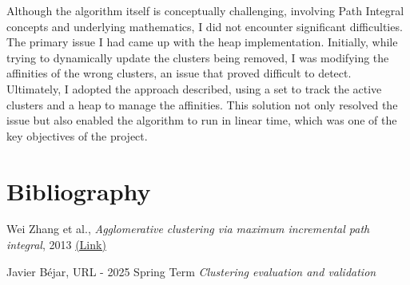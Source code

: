 \documentclass[
	10pt,
	parskip=half-,	
	paper=a4,
	english
	]{scrartcl}
\begin{document}
Although the algorithm itself is conceptually challenging, involving Path Integral concepts and underlying mathematics, I did not encounter significant difficulties. The primary issue I had came up with the heap implementation. Initially, while trying to dynamically update the clusters being removed, I was modifying the affinities of the wrong clusters, an issue that proved difficult to detect. Ultimately, I adopted the approach described, using a set to track the active clusters and a heap to manage the affinities. This solution not only resolved the issue but also enabled the algorithm to run in linear time, which was one of the key objectives of the project.



\newpage
\section{Bibliography}

\renewcommand{\section}[2]{}%
\begin{thebibliography}{9}

Wei Zhang et al.,
\textit{Agglomerative clustering via maximum incremental path integral}, 2013
\href{https://www.sciencedirect.com/science/article/pii/S0031320313001830}{(Link)}

Javier Béjar,
URL - 2025 Spring Term
\textit{Clustering evaluation and validation}

\end{thebibliography}
\end{document}

